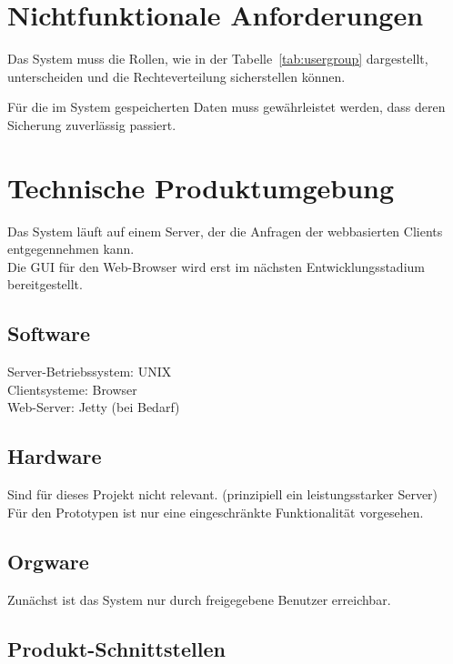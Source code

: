	
	\section{Nichtfunktionale Anforderungen}
	
	\begin{description}
	\item[/Q10/] Das System muss die Rollen, wie in der Tabelle~\ref{tab:usergroup} dargestellt, unterscheiden und die Rechteverteilung sicherstellen können.
	\item[/Q20/] Für die im System gespeicherten Daten muss gewährleistet werden, dass deren Sicherung zuverlässig passiert.
	\end{description} 

	
	
	
	\section{Technische Produktumgebung}
	
	Das System läuft auf einem Server, der die Anfragen der webbasierten Clients entgegennehmen kann.\\
	Die GUI für den Web-Browser wird erst im nächsten Entwicklungsstadium bereitgestellt.
	
		\subsection{Software}
		Server-Betriebssystem: UNIX\\
		Clientsysteme: Browser\\
		Web-Server: Jetty (bei Bedarf)
		
		\subsection{Hardware}
		Sind für dieses Projekt nicht relevant. (prinzipiell ein leistungsstarker Server)\\
		Für den Prototypen ist nur eine eingeschränkte Funktionalität vorgesehen.
		
		\subsection{Orgware}
		
		Zunächst ist das System nur durch freigegebene Benutzer erreichbar.		

		\subsection{Produkt-Schnittstellen}
		
